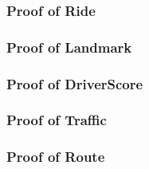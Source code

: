 \subsubsection{Proof of Ride}
\subsubsection{Proof of Landmark}
\subsubsection{Proof of DriverScore}
\subsubsection{Proof of Traffic}
\subsubsection{Proof of Route}

